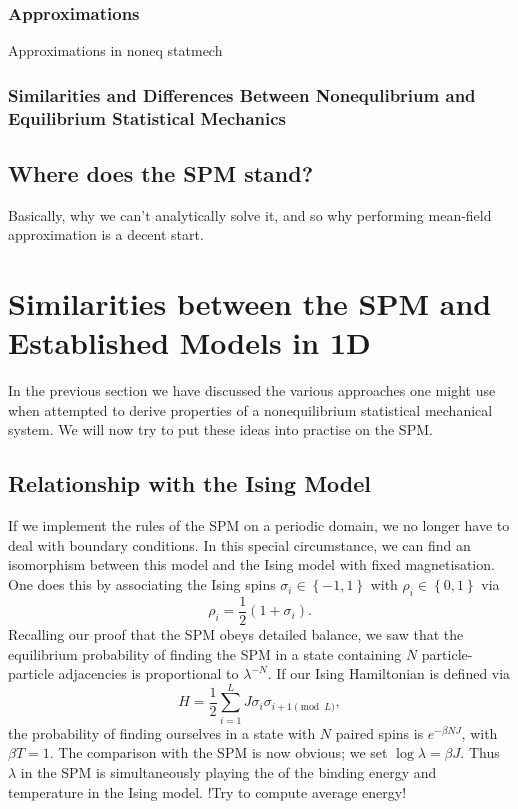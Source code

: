 \subsubsection{Approximations}

Approximations in noneq statmech  

\subsubsection{Similarities and Differences Between Nonequlibrium and Equilibrium Statistical Mechanics}

\subsection{Where does the SPM stand?}
Basically, why we can't analytically solve it, and so why performing mean-field approximation is a decent start.

\section{Similarities between the SPM and Established Models in 1D}
In the previous section we have discussed the various approaches one might use when attempted to derive properties of a nonequilibrium statistical mechanical system. We will now try to put these ideas into practise on the SPM.

\subsection{Relationship with the Ising Model}

If we implement the rules of the SPM on a periodic domain, we no longer have to deal with boundary conditions. In this special circumstance, we can find an isomorphism between this model and the Ising model with fixed magnetisation.
One does this by associating the Ising spins $\sigma_i \in \left\{-1, 1 \right\}$ with $\rho_i \in \left\{ 0, 1 \right\}$ via
\begin{equation}
 \rho_i = \frac{1}{2}\left(1+\sigma_i\right).
\end{equation}
Recalling our proof that the SPM obeys detailed balance, we saw that the equilibrium probability of finding the SPM in a state containing $N$ particle-particle adjacencies is proportional to $\lambda^{-N}$.
If our Ising Hamiltonian is defined via
\begin{equation}
 H = \frac{1}{2} \sum_{i=1}^L J \sigma_i \sigma_{i+1 \pmod L},
\end{equation}
the probability of finding ourselves in a state with $N$ paired spins is $e^{-\beta N J}$, with $\beta T =1$. The comparison with the SPM is now obvious; we set $\log{\lambda} = \beta J$. Thus $\lambda$ in the SPM is simultaneously playing the
of the binding energy and temperature in the Ising model.
!Try to compute average energy!


